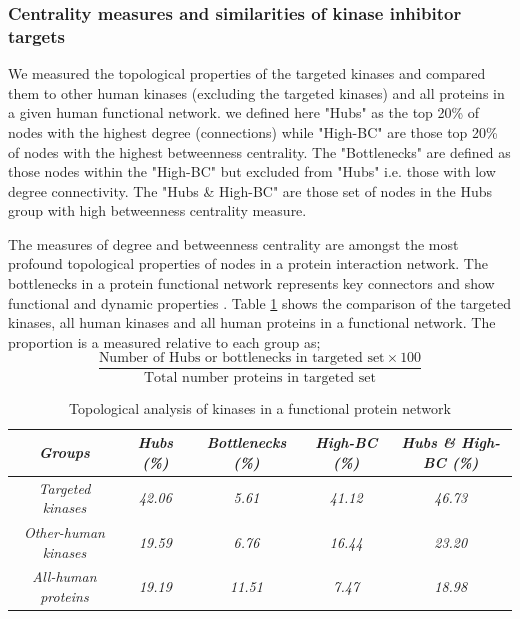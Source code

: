 \documentclass[a4paper, 11pt]{article}
\begin{document}
\subsubsection*{Centrality measures and similarities of kinase inhibitor targets}
We measured the topological properties of the targeted kinases and compared them to other human kinases (excluding the targeted kinases) and all proteins in a given human functional network. we defined here "Hubs" as the top 20\% of nodes with the highest degree (connections) while "High-BC" are those top 20\% of nodes with the highest betweenness centrality. The "Bottlenecks" are defined as those nodes within the "High-BC" but excluded from "Hubs" i.e. those with low degree connectivity. The "Hubs \& High-BC" are those set of nodes in the Hubs group with high betweenness centrality measure. \par
The measures of degree and betweenness centrality are amongst the most profound topological properties of nodes in a protein interaction network. The bottlenecks in a protein functional network represents key connectors and show functional and dynamic properties \cite{yu2007importance}. Table \ref{hubs-bottlenecks} shows the comparison of the targeted kinases, all human kinases and all human proteins in a functional network. The proportion is a measured relative to each group as; 
\[
\frac{\text{Number of Hubs or bottlenecks in targeted set} \times100 } {\text{Total number proteins in targeted set}}
\]

\begin{table}[H]
\centering
\caption{Topological analysis of kinases in a functional protein network}
\label{hubs-bottlenecks}
\begin{tabular}{|c|c|c|c|c|}
\hline
\textit{Groups}             & \textit{Hubs (\%)} & \textit{Bottlenecks (\%)} & \textit{High-BC (\%)} & \textit{Hubs \& High-BC (\%)} \\ \hline
\textit{Targeted kinases}   & \textit{42.06}     & \textit{5.61}              & \textit{41.12}        & \textit{46.73}                \\ \hline
\textit{Other-human kinases}  & \textit{19.59}      & \textit{6.76}             & \textit{16.44}         & \textit{23.20}                  \\ \hline
\textit{All-human proteins} & \textit{19.19}     & \textit{11.51}            & \textit{7.47}         & \textit{18.98}                \\ \hline
\end{tabular}
\end{table}
\end{document}

